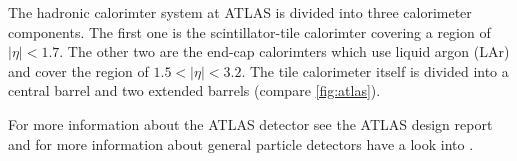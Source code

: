 The hadronic calorimter system at ATLAS is divided into three calorimeter components. The first one is the scintillator-tile calorimter covering a region of $|\eta|<\num{1.7}$. The other two are the end-cap calorimters which use liquid argon (LAr) and cover the region of $\num{1.5}<|\eta|<\num{3.2}$.
The tile calorimeter itself is divided into a central barrel and two extended barrels (compare \ref{fig:atlas}).


For more information about the ATLAS detector see the ATLAS design report \cite{atlastdr} and for more information about general particle detectors have a look into \cite{leo}.

